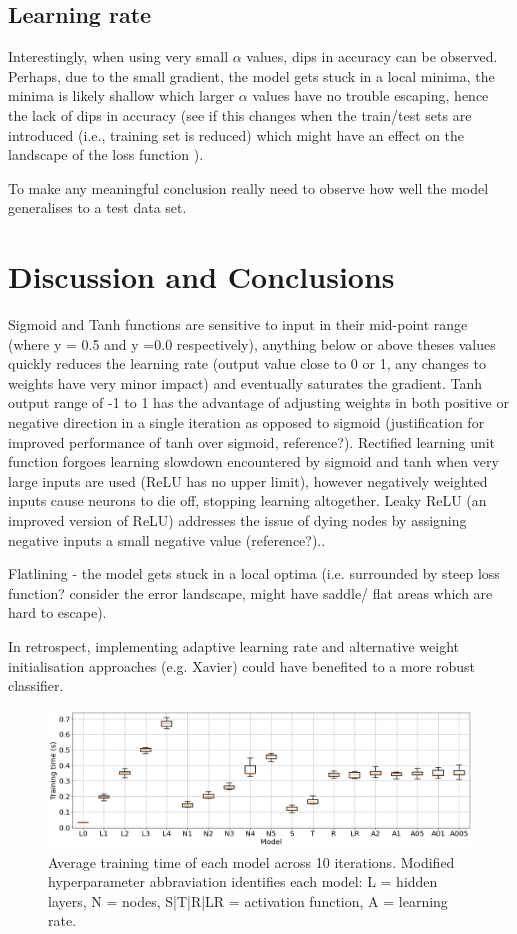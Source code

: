 \documentclass{article}
\begin{document}
\subsection{Learning rate}

Interestingly, when using very small $\alpha$ values, dips in accuracy can be observed. Perhaps, due to the small gradient, the model gets stuck in a local minima, the minima is likely shallow which larger $\alpha$ values have no trouble escaping, hence the lack of dips in accuracy (see if this changes when the train/test sets are introduced (i.e., training set is reduced) which might have an effect on the landscape of the loss function \cite{Guo}).

To make any meaningful conclusion really need to observe how well the model generalises to a test data set.

\section{Discussion and Conclusions}
Sigmoid and Tanh functions are sensitive to input in their mid-point range (where y = 0.5 and y =0.0 respectively), anything below or above theses values quickly reduces the learning rate (output value close to 0 or 1, any changes to weights have very minor impact) and eventually saturates the gradient.
Tanh output range of -1 to 1 has the advantage of adjusting weights in both positive or negative direction in a single iteration as opposed to sigmoid (justification for improved performance of tanh over sigmoid, reference?).
Rectified learning unit function forgoes learning slowdown encountered by sigmoid and tanh when very large inputs are used (ReLU has no upper limit), however negatively weighted inputs cause neurons to die off, stopping learning altogether. Leaky ReLU (an improved version of ReLU) addresses the issue of dying nodes by assigning negative inputs a small negative value (reference?)..

Flatlining - the model gets stuck in a local optima (i.e. surrounded by steep loss function? consider the error landscape, might have saddle/ flat areas which are hard to escape).

In retrospect, implementing adaptive learning rate and alternative weight initialisation approaches (e.g. Xavier) could have benefited to a more robust classifier.

\begin{figure}[H]
  \centering
  \includegraphics[width=\textwidth]{figs/times.png}
  \caption{
    Average training time of each model across 10 iterations.
    Modified hyperparameter abbraviation identifies each model:
    L = hidden layers, N = nodes, S|T|R|LR = activation function,
    A = learning rate.
  }
  \label{fig:times}
\end{figure}
\end{document}
